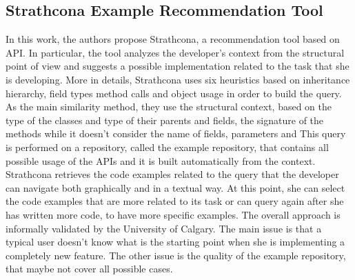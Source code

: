 \subsection{Strathcona Example Recommendation Tool}
In this work, the authors propose Strathcona, a recommendation tool based on API. In particular, the tool analyzes the developer’s context from the structural point of view and suggests a possible implementation related to the task that she is developing. More in details, Strathcona uses six heuristics based on inheritance hierarchy, field types method calls and object usage in order to build the query. As the main similarity method, they use the structural context, based on the type of the classes and  type of their parents and fields, the signature of the methods while it doesn’t consider the name of fields, parameters and 
This query is performed on a repository, called the example repository, that contains all possible usage of the APIs and it is built automatically from the context. Strathcona retrieves the code examples related to the query that the developer can navigate both graphically and in a textual way. At this point, she can select the code examples that are more related to its task or can query again after she has written more code, to have more specific examples. The overall approach is informally validated by the University of Calgary. The main issue is that a typical user doesn’t know what is the starting point when she is implementing a completely new feature. The other issue is the quality of the example repository, that maybe not cover all possible cases. 




